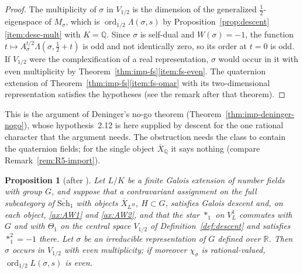 \documentclass[11pt]{amsart}
\theoremstyle{plain}
\newtheorem{proposition}[theorem]{Proposition}
\theoremstyle{definition}
\theoremstyle{remark}
\numberwithin{equation}{section}
\newcommand{\R}{\mathbb{R}}
\newcommand{\Q}{\mathbb{Q}}
\newcommand{\Xbar}{\overline{X}}
\newcommand{\Schbar}{\overline{\mathrm{Sch}}}
\DeclareMathOperator{\ord}{ord}
\begin{document}
\begin{proof}
The multiplicity of $\sigma$ in $V_{1/2}$ is the dimension of the
generalized $\tfrac12$-eigenspace of $M_\sigma$, which is
$\ord_{1/2}\Lambda(\sigma,s)$ by
Proposition~\ref{prop:descent}\ref{item:desc-mult} with $K=\Q$. Since
$\sigma$ is self-dual and $W(\sigma)=-1$, the function
$t\mapsto A_\sigma^{t/2}\Lambda(\sigma,\tfrac12+t)$ is odd and not
identically zero, so its order at $t=0$ is odd. If $V_{1/2}$ were the
complexification of a real representation, $\sigma$ would occur in it
with even multiplicity by Theorem~\ref{thm:imp-fs}\ref{item:fs-even}.
The quaternion extension of
Theorem~\ref{thm:imp-fs}\ref{item:fs-omar} with its two-dimensional
representation satisfies the hypotheses (see the remark after that
theorem).
\end{proof}

This is the argument of Deninger's no-go theorem
(Theorem~\ref{thm:imp-deninger-nogo}), whose hypothesis~2.12
\cite{Deninger2022NoWeil} is here supplied by descent for the one
rational character that the argument needs. The obstruction needs the
class to contain the quaternion fields; for the single object $\Xbar_\Q$
it says nothing (compare Remark~\ref{rem:R5-import}).

\begin{proposition}[{after \cite[2.7--2.8, pp.~3--4]{Deninger2022NoWeil}}]%
\label{prop:root-parity}
Let $L/K$ be a finite Galois extension of number fields with group $G$,
and suppose that a contravariant assignment on the full subcategory
of $\Schbar_1$ with objects $\Xbar_{L^H}$, $H\subset G$, satisfies Galois
descent and, on each
object, \ref{ax:AW1} and \ref{ax:AW2}, and that the star $*_1$ on
$V^1_L$ commutes with $G$ and with $\Theta_1$ on the central space
$V_{1/2}$ of Definition~\ref{def:descent} and satisfies $*_1^2=-1$
there. Let
$\sigma$ be an irreducible representation of $G$ defined over $\R$.
Then $\sigma$ occurs in $V_{1/2}$ with even multiplicity; if moreover
$\chi_\sigma$ is rational-valued, $\ord_{1/2}L(\sigma,s)$ is even.
\end{proposition}
\end{document}
